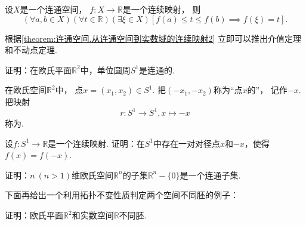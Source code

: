 \begin{theorem}\label{theorem:连通空间.从连通空间到实数域的连续映射2}
设\(X\)是一个连通空间，
\(f\colon X \to \mathbb{R}\)是一个连续映射，
则\begin{equation*}
	(\forall a,b \in X)
	(\forall t\in\mathbb{R})
	(\exists \xi \in X)
	[
		f(a) \leq t \leq f(b)
		\implies
		f(\xi) = t
	].
\end{equation*}
\end{theorem}
根据\cref{theorem:连通空间.从连通空间到实数域的连续映射2} 立即可以推出介值定理和不动点定理.


\begin{example}
证明：在欧氏平面\(\mathbb{R}^2\)中，单位圆周\(S^1\)是连通的.
\end{example}

\begin{definition}
在欧氏空间\(\mathbb{R}^2\)中，
点\(x=(x_1,x_2) \in S^1\).
把\((-x_1,-x_2)\)称为“点\(x\)的”，
记作\(-x\).
把映射\begin{equation*}
	r\colon S^1 \to S^1, x \mapsto -x
\end{equation*}
称为.
\end{definition}

\begin{example}\label{example:连通空间.从单位圆周到实数域的连续映射在一对对径点的值相等}
设\(f\colon S^1 \to \mathbb{R}\)是一个连续映射.
证明：在\(S^1\)中存在一对对径点\(x\)和\(-x\)，使得\(f(x) = f(-x)\).
\end{example}

\begin{example}
证明：\(n\ (n>1)\)维欧氏空间\(\mathbb{R}^n\)的子集\(\mathbb{R}^n-\{0\}\)是一个连通子集.
\end{example}

下面再给出一个利用拓扑不变性质判定两个空间不同胚的例子：
\begin{example}
证明：欧氏平面\(\mathbb{R}^2\)和实数空间\(\mathbb{R}\)不同胚.
\end{example}

